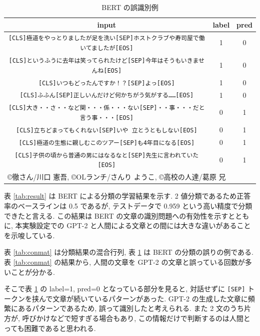 \documentclass[twocolumn]{jarticle}     %
\begin{document}
\begin{table}[tb]
  \begin{center}
    \caption{BERT の誤識別例}
    \begin{tabular}{ccc}
      \hline
      input & label & pred \\
      \hline
      \verb|[CLS]極道をやっとりましたが足を洗い[SEP]ホストクラブや寿司屋で働いてましたが[EOS]| & 1 & 0 \\
      \verb|[CLS]というふうに去年は笑ってられたけど[SEP]今年はそうもいきませんね[EOS]| & 1 & 0 \\
      \verb|[CLS]いつもどったんですか！？[SEP]よっ[EOS]| & 1 & 0 \\
      \verb|[CLS]ふふん[SEP]正しいんだけど何かちがう気がする……[EOS]| & 1 & 0 \\
      \verb|[CLS]大き・・さ・・など関・・・係・・・ない[SEP]・・事・・・だと言う事・・・[EOS]| & 0 & 1 \\
      \verb|[CLS]立ちどまってもくれない[SEP]いや 立とうともしない[EOS]| & 0 & 1 \\
      \verb|[CLS]極道の生態に親しむこのツアー[SEP]も4年目になる[EOS]| & 0 & 1 \\
      \verb|[CLS]子供の頃から普通の男にはなるなと[SEP]先生に言われていた[EOS]| & 0 & 1 \\
      \hline
      \multicolumn{3}{l}{©徹さん/川口 憲吾,   ©OLランチ/さんり ようこ,  ©高校の人達/葛原 兄}
    \end{tabular}
    \label{tab:bert_result}
  \end{center}
\end{table}

表 \ref{tab:result} は BERT による分類の学習結果を示す.
2 値分類であるため正答率のベースラインは 0.5 であるが, テストデータで 0.959 という高い精度で分類できたと言える.
この結果は BERT の文章の識別問題への有効性を示すとともに, 本実験設定での GPT-2 と人間による文章との間には大きな違いがあることを示唆している.



表 \ref{tab:conmat} は分類結果の混合行列,
表 \ref{tab:bert_result} は BERT の分類の誤りの例である.
表 \ref{tab:conmat} の結果から, 人間の文章を GPT-2 の文章と誤っている回数が多いことが分かる.

そこで表 \ref{tab:bert_result} の label=1, pred=0 となっている部分を見ると,
対話せずに \verb|[SEP]| トークンを挟んで文章が続いているパターンがあった.
GPT-2 の生成した文章に頻繁にあるパターンであるため, 誤って識別したと考えられる.
また 2 文のうち片方が, 呼びかけなどで短すぎる場合もあり, この情報だけで判断するのは人間とっても困難であると思われる.
\end{document}
